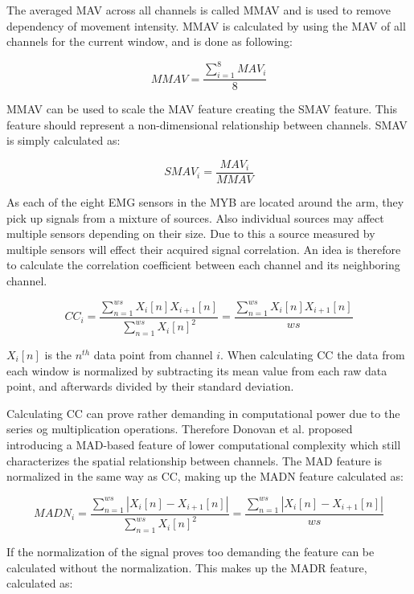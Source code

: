 The averaged MAV across all channels is called MMAV and is used to remove dependency of movement intensity. MMAV is calculated by using the MAV of all channels for the current window, and is done as following: 

\begin{equation} \label{eq:MMAV}
MMAV=\frac{\sum_{i=1}^{8}MAV_i}{8}
\end{equation}

MMAV can be used to scale the MAV feature creating the SMAV feature. This feature should represent a non-dimensional relationship between channels. SMAV is simply calculated as:

\begin{equation} \label{eq:SMAV}
SMAV_i=\frac{MAV_i}{MMAV}
\end{equation}

As each of the eight EMG sensors in the MYB are located around the arm, they pick up signals from a mixture of sources. Also individual sources may affect multiple sensors depending on their size. Due to this a source measured by multiple sensors will effect their acquired signal correlation. An idea is therefore to calculate the correlation coefficient between each channel and its neighboring channel.  

\begin{equation} \label{eq:CC}
CC_i=\frac{\sum_{n=1}^{ws}X_i[n]X_{i+1}[n]}{\sum_{n=1}^{ws}X_i[n]^2}=\frac{\sum_{n=1}^{ws}X_i[n]X_{i+1}[n]}{ws}
\end{equation}

$X_i[n]$ is the $n^{th}$ data point from channel $i$. When calculating CC the data from each window is normalized by subtracting its mean value from each raw data point, and afterwards divided by their standard deviation. 

Calculating CC can prove rather demanding in computational power due to the series og multiplication operations. Therefore Donovan et al. \cite{Donovan2017} proposed introducing a MAD-based feature of lower computational complexity which still characterizes the spatial relationship between channels. The MAD feature is normalized in the same way as CC, making up the MADN feature calculated as: 

\begin{equation} \label{eq:MADN}
MADN_i=\frac{\sum_{n=1}^{ws}|X_i[n]-X_{i+1}[n]|}{\sum_{n=1}^{ws}X_i[n]^2}=\frac{\sum_{n=1}^{ws}|X_i[n]-X_{i+1}[n]|}{ws}
\end{equation}

If the normalization of the signal proves too demanding the feature can be calculated without the normalization. This makes up the MADR feature, calculated as:

